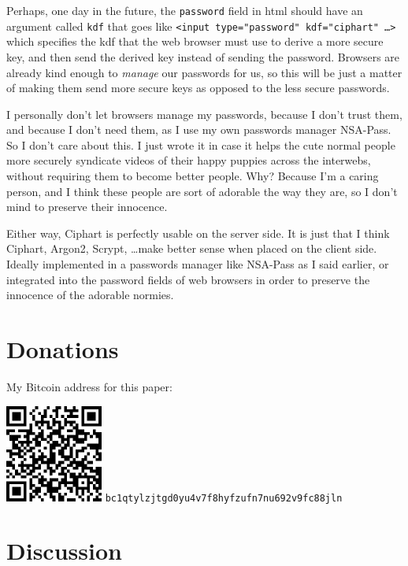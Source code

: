 \documentclass[twocolumn]{article}
\begin{document}
Perhaps, one day in the future, the \texttt{password} field in \gls{html}
should have an argument called \texttt{kdf} that goes like \texttt{<input
type="password" kdf="ciphart" \ldots>} which specifies the \gls{kdf} that
the web browser must use to derive a more secure key, and then send the
derived key instead of sending the password.  Browsers are already kind
enough to \emph{manage} our passwords for us, so this will be just a matter
of making them send more secure keys as opposed to the less secure
passwords.

I personally don't let browsers manage my passwords, because I don't trust
them, and because I don't need them, as I use my own passwords manager
NSA-Pass.  So I don't care about this.  I just wrote it in case it
helps the cute normal people more securely syndicate videos of their happy
puppies across the interwebs, without requiring them to become better
people.  Why?  Because I'm a caring person, and I think these people are
sort of adorable the way they are, so I don't mind to preserve their
innocence.

Either  way, Ciphart is perfectly usable on the server side.  It is
just that I think Ciphart, Argon2, Scrypt, \ldots make
better sense when placed on the client side.  Ideally implemented in a
passwords manager like NSA-Pass as I said earlier, or integrated into
the password fields of web browsers in order to preserve the innocence of
the adorable normies.

\vfill
\break
\appendix
\section{Donations}
My Bitcoin address for this paper:
\begin{center}
    \includegraphics[width=121px]{./pics/btc_wallet_address_trimmed.png}
    \texttt{bc1qtylzjtgd0yu4v7f8hyfzufn7nu692v9fc88jln}
\end{center}

\section{Discussion}
\end{document}
